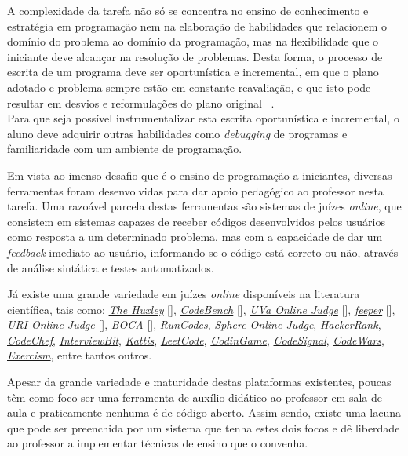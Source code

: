 A complexidade da tarefa não só se concentra no ensino de conhecimento e 
estratégia em programação nem na elaboração de habilidades que relacionem o domínio 
do problema ao domínio da programação, mas na flexibilidade que o iniciante deve 
alcançar na resolução de problemas. Desta forma, o processo de escrita 
de um programa deve  ser oportunística e incremental, em que o plano adotado 
e problema sempre estão em 
constante reavaliação, e que isto pode resultar em desvios e reformulações do plano
original \ \cite{visser1990more}. \\
Para que seja possível instrumentalizar esta escrita oportunística e incremental, 
o aluno deve adquirir outras habilidades como \emph{debugging} de programas e 
familiaridade com um ambiente de programação.

Em vista ao imenso desafio que é o ensino de programação a iniciantes, diversas ferramentas 
foram desenvolvidas para dar apoio pedagógico ao professor nesta tarefa. Uma razoável parcela 
destas ferramentas são sistemas de juízes \emph{online}, que consistem em sistemas capazes 
de receber códigos desenvolvidos pelos usuários como resposta a um determinado problema, mas 
com a capacidade de dar um \emph{feedback} imediato ao usuário, informando 
se o código está correto ou não, através de análise sintática e testes automatizados.

Já existe uma grande variedade em juízes \emph{online} disponíveis na literatura científica,
tais como: 
\hyperref[link:the_huxley]{\emph{The Huxley}} [], 
	\hyperref[link:code_bench]{\emph{CodeBench}} [],  
	\hyperref[link:uva_judge]{\emph{UVa Online Judge}} [], 
	\hyperref[link:feeper]{\emph{feeper}} [], 
	\hyperref[link:uri_judge]{\emph{URI Online Judge}} [], 
	\hyperref[link:boca]{\emph{BOCA}} [],
	\hyperref[link:we_run_codes]{\emph{RunCodes}},
	\hyperref[link:sphere_judge]{\emph{Sphere Online Judge}},
	\hyperref[link:hacker_rank]{\emph{HackerRank}}, 
	\hyperref[link:code_chef]{\emph{CodeChef}}, 
	\hyperref[link:interview_bit]{\emph{InterviewBit}}, 
	\hyperref[link:kattis]{\emph{Kattis}}, 
	\hyperref[link:leet_code]{\emph{LeetCode}}, 
	\hyperref[link:codin_game]{\emph{CodinGame}}, 
	\hyperref[link:code_signal]{\emph{CodeSignal}}, 
	\hyperref[link:code_wars]{\emph{CodeWars}}, 
	\hyperref[link:exercism]{\emph{Exercism}}, 
	entre tantos outros.

Apesar da grande variedade e maturidade destas plataformas existentes, poucas 
têm como foco ser uma ferramenta de auxílio didático ao professor em sala de aula e 
praticamente nenhuma é de código aberto. Assim sendo, existe uma lacuna que pode
ser preenchida por um sistema que tenha estes dois focos e dê liberdade ao professor 
a implementar técnicas de ensino que o convenha.


